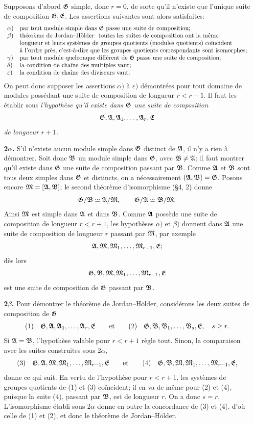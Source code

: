 Supposons d'abord $\mathfrak{G}$ simple, donc $r=0$, de sorte qu'il n'existe que l'unique suite de composition $\mathfrak{G},\mathfrak{E}$. Les assertions suivantes sont alors satisfaites:
\[
\begin{array}{ll}
\alpha) & \text{par tout module simple dans $\mathfrak{G}$ passe une suite de composition;}\\
\beta)  & \text{théorème de Jordan--Hölder: toutes les suites de composition ont la même}\\
         & \text{longueur et leurs systèmes de groupes quotients (modules quotients) coïncident}\\
         & \text{à l'ordre près, c'est-à-dire que les groupes quotients correspondants sont isomorphes;}\\
\gamma) & \text{par tout module quelconque différent de $\mathfrak{G}$ passe une suite de composition;}\\
\delta) & \text{la condition de chaîne des multiples vaut;}\\
\varepsilon) & \text{la condition de chaîne des diviseurs vaut.}
\end{array}
\]
On peut donc supposer les assertions $\alpha)$ à $\varepsilon)$ démontrées pour tout domaine de modules possédant une suite de composition de longueur $\bar r<r+1$. Il faut les établir sous \emph{l'hypothèse qu'il existe dans $\mathfrak{G}$ une suite de composition}
\[
        \mathfrak{G},\mathfrak{A},\mathfrak{A}_1,\ldots,\mathfrak{A}_r,\mathfrak{E}
\]
\emph{de longueur $r+1$.}

\textbf{2$\alpha$.} S'il n'existe aucun module simple dans $\mathfrak{G}$ distinct de $\mathfrak{A}$, il n'y a rien à démontrer. Soit donc $\mathfrak{B}$ un module simple dans $\mathfrak{G}$, avec $\mathfrak{B}\ne\mathfrak{A}$; il faut montrer qu'il existe dans $\mathfrak{G}$ une suite de composition passant par $\mathfrak{B}$. Comme $\mathfrak{A}$ et $\mathfrak{B}$ sont tous deux simples dans $\mathfrak{G}$ et distincts, on a nécessairement $(\mathfrak{A},\mathfrak{B})=\mathfrak{G}$. Posons encore $\mathfrak{M}=[\mathfrak{A},\mathfrak{B}]$; le second théorème d'isomorphisme (\S{}4, 2) donne
\[
        \mathfrak{G}/\mathfrak{B}\simeq\mathfrak{A}/\mathfrak{M},
        \qquad
        \mathfrak{G}/\mathfrak{A}\simeq\mathfrak{B}/\mathfrak{M}.
\]
Ainsi $\mathfrak{M}$ est simple dans $\mathfrak{A}$ et dans $\mathfrak{B}$. Comme $\mathfrak{A}$ possède une suite de composition de longueur $r<r+1$, les hypothèses $\alpha)$ et $\beta)$ donnent dans $\mathfrak{A}$ une suite de composition de longueur $r$ passant par $\mathfrak{M}$, par exemple
\[
        \mathfrak{A},\mathfrak{M},\mathfrak{M}_1,\ldots,\mathfrak{M}_{r-1},\mathfrak{E};
\]
dès lors
\[
        \mathfrak{G},\mathfrak{B},\mathfrak{M},\mathfrak{M}_1,\ldots,\mathfrak{M}_{r-1},\mathfrak{E}
\]
est une suite de composition de $\mathfrak{G}$ passant par $\mathfrak{B}$.

\textbf{2$\beta$.} Pour démontrer le théorème de Jordan--Hölder, considérons les deux suites de composition de $\mathfrak{G}$
\[
 (1)\quad \mathfrak{G},\mathfrak{A},\mathfrak{A}_1,\ldots,\mathfrak{A}_r,\mathfrak{E}
 \qquad\text{et}\qquad
 (2)\quad \mathfrak{G},\mathfrak{B},\mathfrak{B}_1,\ldots,\mathfrak{B}_s,\mathfrak{E},
 \quad s\ge r.
\]
Si $\mathfrak{A}=\mathfrak{B}$, l'hypothèse valable pour $r<r+1$ règle tout. Sinon, la comparaison avec les suites construites sous 2$\alpha$,
\[
 (3)\quad \mathfrak{G},\mathfrak{A},\mathfrak{M},\mathfrak{M}_1,\ldots,\mathfrak{M}_{r-1},\mathfrak{E}
 \qquad\text{et}\qquad
 (4)\quad \mathfrak{G},\mathfrak{B},\mathfrak{M},\mathfrak{M}_1,\ldots,\mathfrak{M}_{r-1},\mathfrak{E},
\]
donne ce qui suit. En vertu de l'hypothèse pour $r<r+1$, les systèmes de groupes quotients de (1) et (3) coïncident; il en va de même pour (2) et (4), puisque la suite (4), passant par $\mathfrak{B}$, est de longueur $r$. On a donc $s=r$. L'isomorphisme établi sous 2$\alpha$ donne en outre la concordance de (3) et (4), d'où celle de (1) et (2), et donc le théorème de Jordan--Hölder.

